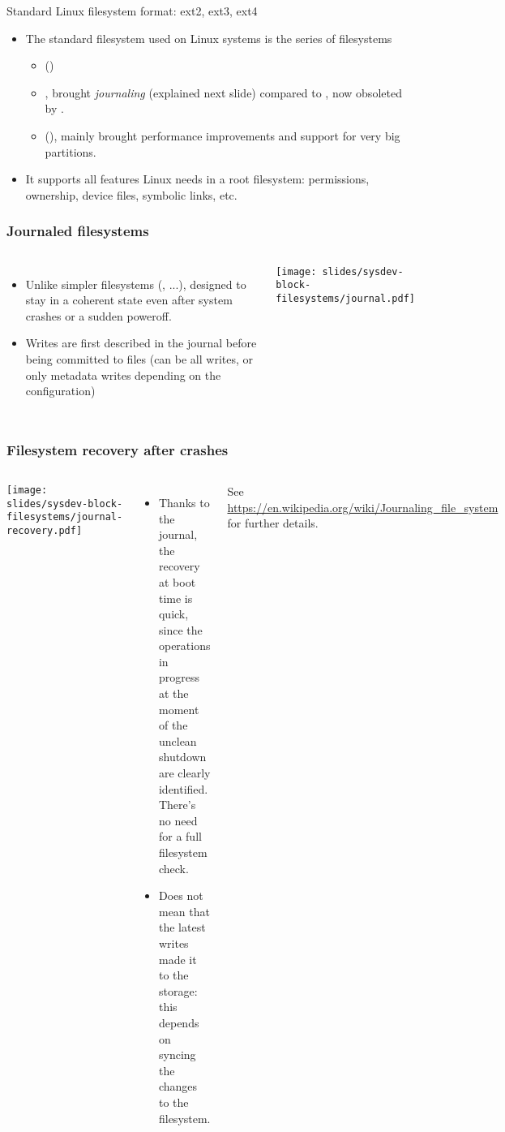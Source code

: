 \begin{frame}{Standard Linux filesystem format: ext2, ext3, ext4}
  \begin{itemize}
  \item The standard filesystem used on Linux systems is the series of
     filesystems
    \begin{itemize}
    \item {} ()
    \item {}, brought {\em journaling} (explained next slide)
          compared to , now obsoleted by .
    \item {} (), mainly brought performance improvements and
          support for very big partitions.
    \end{itemize}
  \item It supports all features Linux needs in a root filesystem:
    permissions, ownership, device files, symbolic links, etc.
  \end{itemize}
\end{frame}

\begin{frame}
  \frametitle{Journaled filesystems}
  \begin{columns}
    \begin{itemize}
    \item Unlike simpler filesystems (, ...),
      designed to stay in a coherent state even after system
      crashes or a sudden poweroff.
    \item Writes are first described in the journal before being
      committed to files (can be all writes, or only metadata writes
      depending on the configuration)
    \end{itemize}
    \texttt{[image: slides/sysdev-block-filesystems/journal.pdf]}
  \end{columns}
\end{frame}

\begin{frame}
  \frametitle{Filesystem recovery after crashes}
  \begin{columns}
    \texttt{[image: slides/sysdev-block-filesystems/journal-recovery.pdf]}
    \begin{itemize}
    \item Thanks to the journal, the recovery at boot time is quick,
      since the operations in progress at the moment of the unclean
      shutdown are clearly identified. There's no need for a full
      filesystem check.
    \item Does not mean that the latest writes made it to the storage:
      this depends on syncing the changes to the filesystem.
    \end{itemize}
    See \url{https://en.wikipedia.org/wiki/Journaling_file_system}
    for further details.
  \end{columns}
\end{frame}

